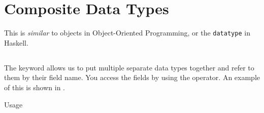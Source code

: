\section{Composite Data Types}\label{sec:Composite_Data_Types}
This is \textit{similar} to objects in Object-Oriented Programming, or the \texttt{datatype} in Haskell.

\subsection{\texorpdfstring{}{\texttt{struct}}}\label{subsec:struct}
The  keyword allows us to put multiple separate data types together and refer to them by their field name.
You access the fields by using the  operator.
An example of this is shown in .

\begin{listing}[h!tbp]
\caption{\texorpdfstring{}{\texttt{struct}} Usage}
\label{lst:struct_Usage}
\end{listing}


